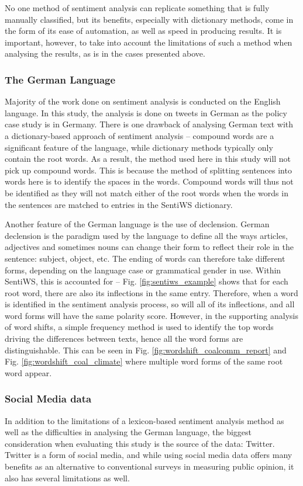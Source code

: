 \documentclass[12pt,onecolumn,twoside]{layout}
\begin{document}
No one method of sentiment analysis can replicate something that is fully manually classified, but its benefits, especially with dictionary methods, come in the form of its ease of automation, as well as speed in producing results. It is important, however, to take into account the limitations of such a method when analysing the results, as is in the cases presented above. 

\subsubsection*{The German Language} 
Majority of the work done on sentiment analysis is conducted on the English language. In this study, the analysis is done on tweets in German as the policy case study is in Germany. There is one drawback of analysing German text with a dictionary-based approach of sentiment analysis -- compound words are a significant feature of the language, while dictionary methods typically only contain the root words. As a result, the method used here in this study will not pick up compound words. This is because the method of splitting sentences into words here is to identify the spaces in the words. Compound words will thus not be identified as they will not match either of the root words when the words in the sentences are matched to entries in the SentiWS dictionary. 

Another feature of the German language is the use of declension. German declension is the paradigm used by the language to define all the ways articles, adjectives and sometimes nouns can change their form to reflect their role in the sentence: subject, object, etc. The ending of words can therefore take different forms, depending on the language case or grammatical gender in use. Within SentiWS, this is accounted for -- Fig. \ref{fig:sentiws_example} shows that for each root word, there are also its inflections in the same entry. Therefore, when a word is identified in the sentiment analysis process, so will all of its inflections, and all word forms will have the same polarity score. However, in the supporting analysis of word shifts, a simple frequency method is used to identify the top words driving the differences between texts, hence all the word forms are distinguishable. This can be seen in Fig. \ref{fig:wordshift_coalcomm_report} and Fig. \ref{fig:wordshift_coal_climate} where multiple word forms of the same root word appear. 

\subsubsection*{Social Media data} 
In addition to the limitations of a lexicon-based sentiment analysis method as well as the difficulties in analysing the German language, the biggest consideration when evaluating this study is the source of the data: Twitter. Twitter is a form of social media, and while using social media data offers many benefits as an alternative to conventional surveys in measuring public opinion, it also has several limitations as well. 
\end{document}
